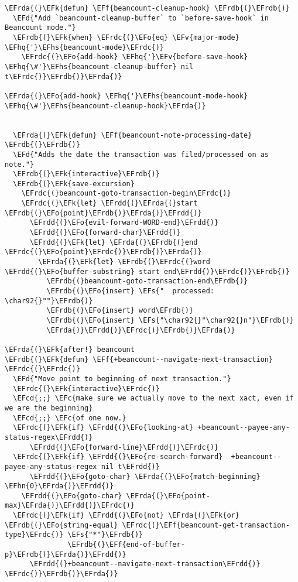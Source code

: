 \documentclass[a4wide,10pt]{article}
\newcommand{\EFc}[1]{\textcolor{EFc}{#1}} %
\newcommand{\EFcd}[1]{\textcolor{EFcd}{#1}} %
\newcommand{\EFs}[1]{\textcolor{EFs}{#1}} %
\newcommand{\EFd}[1]{\textcolor{EFd}{#1}} %
\newcommand{\EFk}[1]{\textcolor{EFk}{#1}} %
\newcommand{\EFf}[1]{\textcolor{EFf}{#1}} %
\newcommand{\EFv}[1]{\textcolor{EFv}{#1}} %
\newcommand{\EFo}[1]{\textcolor{EFo}{#1}} %
\newcommand{\EFhn}[1]{\textcolor{EFhn}{\textbf{#1}}} %
\newcommand{\EFhq}[1]{\textcolor{EFhq}{#1}} %
\newcommand{\EFhs}[1]{\textcolor{EFhs}{#1}} %
\newcommand{\EFrda}[1]{\textcolor{EFrda}{#1}} %
\newcommand{\EFrdb}[1]{\textcolor{EFrdb}{#1}} %
\newcommand{\EFrdc}[1]{\textcolor{EFrdc}{#1}} %
\newcommand{\EFrdd}[1]{\textcolor{EFrdd}{#1}} %
\begin{document}
\begin{Code}
\begin{Verbatim}
\EFrda{(}\EFk{defun} \EFf{beancount-cleanup-hook} \EFrdb{(}\EFrdb{)}
  \EFd{"Add `beancount-cleanup-buffer` to `before-save-hook` in Beancount mode."}
  \EFrdb{(}\EFk{when} \EFrdc{(}\EFo{eq} \EFv{major-mode} \EFhq{'}\EFhs{beancount-mode}\EFrdc{)}
    \EFrdc{(}\EFo{add-hook} \EFhq{'}\EFv{before-save-hook} \EFhq{\#'}\EFhs{beancount-cleanup-buffer} nil t\EFrdc{)}\EFrdb{)}\EFrda{)}

\EFrda{(}\EFo{add-hook} \EFhq{'}\EFhs{beancount-mode-hook} \EFhq{\#'}\EFhs{beancount-cleanup-hook}\EFrda{)}


  \EFrda{(}\EFk{defun} \EFf{beancount-note-processing-date} \EFrdb{(}\EFrdb{)}
  \EFd{"Adds the date the transaction was filed/processed on as note."}
  \EFrdb{(}\EFk{interactive}\EFrdb{)}
  \EFrdb{(}\EFk{save-excursion}
    \EFrdc{(}beancount-goto-transaction-begin\EFrdc{)}
    \EFrdc{(}\EFk{let} \EFrdd{(}\EFrda{(}start \EFrdb{(}\EFo{point}\EFrdb{)}\EFrda{)}\EFrdd{)}
      \EFrdd{(}\EFo{evil-forward-WORD-end}\EFrdd{)}
      \EFrdd{(}\EFo{forward-char}\EFrdd{)}
      \EFrdd{(}\EFk{let} \EFrda{(}\EFrdb{(}end \EFrdc{(}\EFo{point}\EFrdc{)}\EFrdb{)}\EFrda{)}
        \EFrda{(}\EFk{let} \EFrdb{(}\EFrdc{(}word \EFrdd{(}\EFo{buffer-substring} start end\EFrdd{)}\EFrdc{)}\EFrdb{)}
          \EFrdb{(}beancount-goto-transaction-end\EFrdb{)}
          \EFrdb{(}\EFo{insert} \EFs{"  processed: \char92{}""}\EFrdb{)}
          \EFrdb{(}\EFo{insert} word\EFrdb{)}
          \EFrdb{(}\EFo{insert} \EFs{"\char92{}"\char92{}n"}\EFrdb{)}
          \EFrda{)}\EFrdd{)}\EFrdc{)}\EFrdb{)}\EFrda{)}

\EFrda{(}\EFk{after!} beancount
\EFrdb{(}\EFk{defun} \EFf{+beancount--navigate-next-transaction} \EFrdc{(}\EFrdc{)}
  \EFd{"Move point to beginning of next transaction."}
  \EFrdc{(}\EFk{interactive}\EFrdc{)}
  \EFcd{;;} \EFc{make sure we actually move to the next xact, even if we are the beginning}
  \EFcd{;;} \EFc{of one now.}
  \EFrdc{(}\EFk{if} \EFrdd{(}\EFo{looking-at} +beancount--payee-any-status-regex\EFrdd{)}
      \EFrdd{(}\EFo{forward-line}\EFrdd{)}\EFrdc{)}
  \EFrdc{(}\EFk{if} \EFrdd{(}\EFo{re-search-forward}  +beancount--payee-any-status-regex nil t\EFrdd{)}
      \EFrdd{(}\EFo{goto-char} \EFrda{(}\EFo{match-beginning} \EFhn{0}\EFrda{)}\EFrdd{)}
    \EFrdd{(}\EFo{goto-char} \EFrda{(}\EFo{point-max}\EFrda{)}\EFrdd{)}\EFrdc{)}
  \EFrdc{(}\EFk{if} \EFrdd{(}\EFo{not} \EFrda{(}\EFk{or} \EFrdb{(}\EFo{string-equal} \EFrdc{(}\EFf{beancount-get-transaction-type}\EFrdc{)} \EFs{"*"}\EFrdb{)}
               \EFrdb{(}\EFf{end-of-buffer-p}\EFrdb{)}\EFrda{)}\EFrdd{)}
      \EFrdd{(}+beancount--navigate-next-transaction\EFrdd{)}
\EFrdc{)}\EFrdb{)}\EFrda{)}


\end{Verbatim}
\end{Code}
\end{document}
